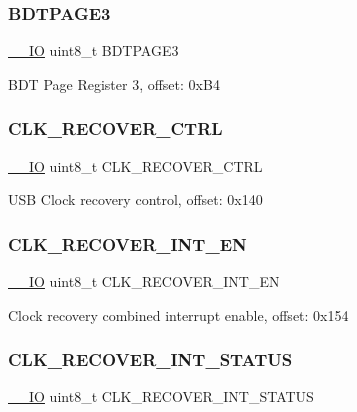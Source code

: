 \subsubsection{\texorpdfstring{BDTPAGE3}{BDTPAGE3}}
{\footnotesize\ttfamily \mbox{\hyperlink{core__cm0plus_8h_aec43007d9998a0a0e01faede4133d6be}{\+\_\+\+\_\+\+IO}} uint8\+\_\+t B\+D\+T\+P\+A\+G\+E3}

B\+DT Page Register 3, offset\+: 0x\+B4 \mbox{\label{struct_u_s_b___type_aa40fc6462cf87d4569e0039075b5890b}} 
\subsubsection{\texorpdfstring{CLK\_RECOVER\_CTRL}{CLK\_RECOVER\_CTRL}}
{\footnotesize\ttfamily \mbox{\hyperlink{core__cm0plus_8h_aec43007d9998a0a0e01faede4133d6be}{\+\_\+\+\_\+\+IO}} uint8\+\_\+t C\+L\+K\+\_\+\+R\+E\+C\+O\+V\+E\+R\+\_\+\+C\+T\+RL}

U\+SB Clock recovery control, offset\+: 0x140 \mbox{\label{struct_u_s_b___type_aa3c8a58fb8efc1e8e238232aa765a801}} 
\subsubsection{\texorpdfstring{CLK\_RECOVER\_INT\_EN}{CLK\_RECOVER\_INT\_EN}}
{\footnotesize\ttfamily \mbox{\hyperlink{core__cm0plus_8h_aec43007d9998a0a0e01faede4133d6be}{\+\_\+\+\_\+\+IO}} uint8\+\_\+t C\+L\+K\+\_\+\+R\+E\+C\+O\+V\+E\+R\+\_\+\+I\+N\+T\+\_\+\+EN}

Clock recovery combined interrupt enable, offset\+: 0x154 \mbox{\label{struct_u_s_b___type_a45cfec446adcac8826db39db8dfb292d}} 
\subsubsection{\texorpdfstring{CLK\_RECOVER\_INT\_STATUS}{CLK\_RECOVER\_INT\_STATUS}}
{\footnotesize\ttfamily \mbox{\hyperlink{core__cm0plus_8h_aec43007d9998a0a0e01faede4133d6be}{\+\_\+\+\_\+\+IO}} uint8\+\_\+t C\+L\+K\+\_\+\+R\+E\+C\+O\+V\+E\+R\+\_\+\+I\+N\+T\+\_\+\+S\+T\+A\+T\+US}


